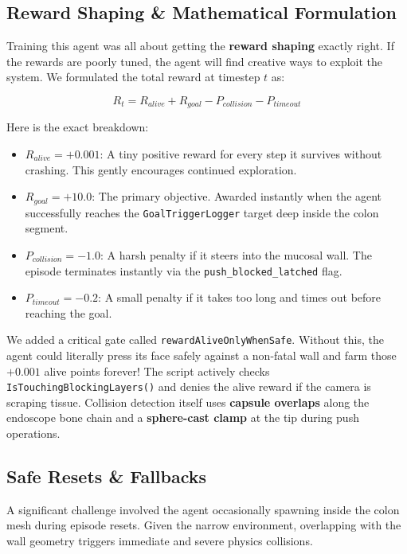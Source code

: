 \subsection{Reward Shaping \& Mathematical Formulation}
Training this agent was all about getting the \textbf{reward shaping} exactly right. If the rewards are poorly tuned, the agent will find creative ways to exploit the system. We formulated the total reward at timestep $t$ as:

\begin{equation}
R_t = R_{alive} + R_{goal} - P_{collision} - P_{timeout}
\end{equation}

Here is the exact breakdown:
\begin{itemize}
    \item $R_{alive} = +0.001$: A tiny positive reward for every step it survives without crashing. This gently encourages continued exploration.
    \item $R_{goal} = +10.0$: The primary objective. Awarded instantly when the agent successfully reaches the \texttt{GoalTriggerLogger} target deep inside the colon segment.
    \item $P_{collision} = -1.0$: A harsh penalty if it steers into the mucosal wall. The episode terminates instantly via the \texttt{push\_blocked\_latched} flag.
    \item $P_{timeout} = -0.2$: A small penalty if it takes too long and times out before reaching the goal.
\end{itemize}

We added a critical gate called \texttt{rewardAliveOnlyWhenSafe}. Without this, the agent could literally press its face safely against a non-fatal wall and farm those $+0.001$ alive points forever! The script actively checks \texttt{IsTouchingBlockingLayers()} and denies the alive reward if the camera is scraping tissue. Collision detection itself uses \textbf{capsule overlaps} along the endoscope bone chain and a \textbf{sphere-cast clamp} at the tip during push operations.

\subsection{Safe Resets \& Fallbacks}
A significant challenge involved the agent occasionally spawning inside the colon mesh during episode resets. Given the narrow environment, overlapping with the wall geometry triggers immediate and severe physics collisions.

